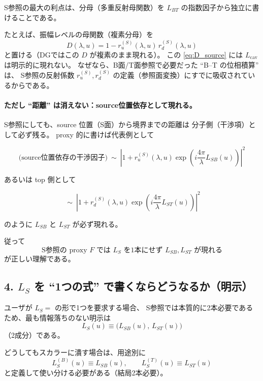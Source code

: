 S参照の最大の利点は、分母（多重反射母関数）を
\(\boxed{L_{BT}}\) の指数因子から独立に書けることである。

たとえば、振幅レベルの母関数（複素分母）を
\begin{equation}
\boxed{
D(\lambda,u)=1-r_u^{(S)}(\lambda,u)\,r_d^{(S)}(\lambda,u)
}
\label{eq:D_source}
\end{equation}
と置ける（DGではこの \(D\) が複素のまま現れる）。
この \eqref{eq:D_source} には
\(\boxed{L_{\mathrm{cav}}}\) は明示的に現れない。
なぜなら、B面/T面参照で必要だった ``B--T の位相積算'' は、
S参照の反射係数 \(r_u^{(S)}, r_d^{(S)}\) の定義（参照面変換）にすでに吸収されているからである。

\paragraph{ただし ``距離'' は消えない：source位置依存として現れる。}
S参照にしても、source 位置（S面）から境界までの距離は
分子側（干渉項）として必ず残る。
proxy 的に書けば代表例として

\begin{equation}
\boxed{
\text{(source位置依存の干渉因子)}
\ \sim\
\left|1+r_u^{(S)}(\lambda,u)\exp\!\left(i\frac{4\pi}{\lambda}L_{SB}(u)\right)\right|^2
}
\end{equation}

あるいは top 側として

\begin{equation}
\boxed{
\ \sim\
\left|1+r_d^{(S)}(\lambda,u)\exp\!\left(i\frac{4\pi}{\lambda}L_{ST}(u)\right)\right|^2
}
\end{equation}

のように \(\boxed{L_{SB}}\) と \(\boxed{L_{ST}}\) が必ず現れる。

従って
\[
\boxed{\text{S参照の proxy \(F\) では \(L_S\) を1本にせず \(L_{SB},L_{ST}\) が現れる}}
\]
が正しい理解である。

\subsection*{4. \(L_S\) を ``1つの式'' で書くならどうなるか（明示）}

ユーザが \(L_S=\) の形で1つを要求する場合、
S参照では本質的に2本必要であるため、最も情報落ちのない明示は
\begin{equation}
\boxed{
L_S(u)\equiv\big(L_{SB}(u),\,L_{ST}(u)\big)
}
\end{equation}
（2成分）である。

どうしてもスカラーに潰す場合は、用途別に
\begin{equation}
\boxed{
L_S^{(B)}(u)\equiv L_{SB}(u),
\qquad
L_S^{(T)}(u)\equiv L_{ST}(u)
}
\end{equation}
と定義して使い分ける必要がある（結局2本必要）。


